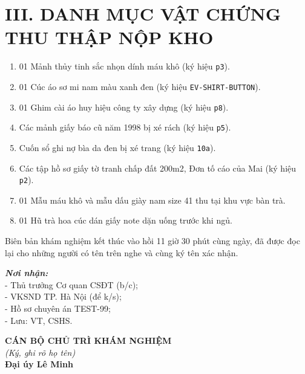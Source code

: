 \documentclass[12pt,a4paper]{article}
\begin{document}
\section*{III. DANH MỤC VẬT CHỨNG THU THẬP NỘP KHO}
\begin{enumerate}[label=\arabic*., leftmargin=1.5cm]
    \item 01 Mảnh thủy tinh sắc nhọn dính máu khô (ký hiệu \texttt{p3}).
    \item 01 Cúc áo sơ mi nam màu xanh đen (ký hiệu \texttt{EV-SHIRT-BUTTON}).
    \item 01 Ghim cài áo huy hiệu công ty xây dựng (ký hiệu \texttt{p8}).
    \item Các mảnh giấy báo cũ năm 1998 bị xé rách (ký hiệu \texttt{p5}).
    \item Cuốn sổ ghi nợ bìa da đen bị xé trang (ký hiệu \texttt{10a}).
    \item Các tập hồ sơ giấy tờ tranh chấp đất 200m2, Đơn tố cáo của Mai (ký hiệu \texttt{p2}).
    \item 01 Mẫu máu khô và mẫu dấu giày nam size 41 thu tại khu vực bàn trà.
    \item 01 Hũ trà hoa cúc dán giấy note dặn uống trước khi ngủ.
\end{enumerate}

\noindent Biên bản khám nghiệm kết thúc vào hồi 11 giờ 30 phút cùng ngày, đã được đọc lại cho những người có tên trên nghe và cùng ký tên xác nhận.

\vspace{0.8cm}

\noindent
\begin{minipage}[t]{0.45\textwidth}
    \small
    \textbf{\textit{Nơi nhận:}}\\
    - Thủ trưởng Cơ quan CSĐT (b/c);\\
    - VKSND TP. Hà Nội (để k/s);\\
    - Hồ sơ chuyên án TEST-99;\\
    - Lưu: VT, CSHS.
\end{minipage}
\hfill
\begin{minipage}[t]{0.5\textwidth}
    \begin{center}
        \small
        \textbf{CÁN BỘ CHỦ TRÌ KHÁM NGHIỆM}\\
        \textit{(Ký, ghi rõ họ tên)}\\[1.5cm]
        \textbf{Đại úy Lê Minh}
    \end{center}
\end{minipage}
\end{document}

